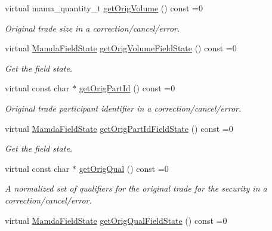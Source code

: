 \begin{CompactItemize}
virtual mama\_\-quantity\_\-t \hyperlink{classWombat_1_1MamdaTradeCancelOrError_e821262ca4d590263adc9a6bacd014b0}{get\-Orig\-Volume} () const =0
\begin{CompactList}\small\item\em Original trade size in a correction/cancel/error. \item\end{CompactList}\item 
virtual \hyperlink{namespaceWombat_93aac974f2ab713554fd12a1fa3b7d2a}{Mamda\-Field\-State} \hyperlink{classWombat_1_1MamdaTradeCancelOrError_c23958d17e2f14b4e29d7e360be35098}{get\-Orig\-Volume\-Field\-State} () const =0
\begin{CompactList}\small\item\em Get the field state. \item\end{CompactList}\item 
virtual const char $\ast$ \hyperlink{classWombat_1_1MamdaTradeCancelOrError_081cabbd540153e1d7ac93b927ff3542}{get\-Orig\-Part\-Id} () const =0
\begin{CompactList}\small\item\em Original trade participant identifier in a correction/cancel/error. \item\end{CompactList}\item 
virtual \hyperlink{namespaceWombat_93aac974f2ab713554fd12a1fa3b7d2a}{Mamda\-Field\-State} \hyperlink{classWombat_1_1MamdaTradeCancelOrError_0aa9f79553091ce4de69eb380be0f7b5}{get\-Orig\-Part\-Id\-Field\-State} () const =0
\begin{CompactList}\small\item\em Get the field state. \item\end{CompactList}\item 
virtual const char $\ast$ \hyperlink{classWombat_1_1MamdaTradeCancelOrError_970107e24e85f02515bc3d5ae182aafc}{get\-Orig\-Qual} () const =0
\begin{CompactList}\small\item\em A normalized set of qualifiers for the original trade for the security in a correction/cancel/error. \item\end{CompactList}\item 
virtual \hyperlink{namespaceWombat_93aac974f2ab713554fd12a1fa3b7d2a}{Mamda\-Field\-State} \hyperlink{classWombat_1_1MamdaTradeCancelOrError_8204745a6698558a00ec0140622de754}{get\-Orig\-Qual\-Field\-State} () const =0

\end{CompactItemize}
